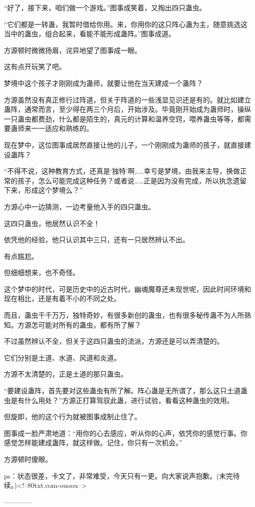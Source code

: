 \begin{this_body}
“好了，接下来，咱们做一个游戏。”图事成笑着，又掏出四只蛊虫。

“它们都是一转蛊，我暂时借给你用。来，你用你的这只阵心蛊为主，随意挑选这当中的蛊虫，组合起来，看能不能形成蛊阵。”图事成道。

方源顿时微微扬眉，诧异地望了图事成一眼。

这有点开玩笑了吧。

梦境中这个孩子才刚刚成为蛊师，就要让他在当天建成一个蛊阵？

方源虽然没有真正修行过阵道，但关于阵道的一些浅显见识还是有的。就比如建立蛊阵，通常而言，至少得在两三个月后，开始涉及。毕竟刚开始成为蛊师时，操纵一只蛊虫都费劲，什么都是陌生的，真元的计算和温养空窍，喂养蛊虫等等，都需要蛊师来一一适应和熟练的。

现在梦中，这位图事成居然直接让他的儿子，一个刚刚成为蛊师的孩子，就直接建设蛊阵？

“不得不说，这种教育方式，还真是‘独特’啊……幸亏是梦境，由我来主导，换做正常的孩子，怎么可能完成这种任务？或者说……正是因为没有完成，所以执念遗留下来，形成这个梦境么？”

方源心中一边猜测，一边考量他入手的四只蛊虫。

这四只蛊虫，他居然认识不全！

依凭他的经验，他只认识其中三只，还有一只居然辨认不出。

有点尴尬。

但细细想来，也不奇怪。

这个梦中的时代，可是历史中的近古时代，幽魂魔尊还未现世呢，因此时间环境和现在相比，还是有着不小的不同之处。

而且，蛊虫千千万万，独特奇妙，有很多新创的蛊虫，也有很多秘传蛊不为人所熟知。方源怎可能对所有的蛊虫，都有所了解？

不过虽然辨认不全，但关于这四只蛊虫的流派，方源还是可以弄清楚的。

它们分别是土道、水道、风道和炎道。

方源不太清楚的，正是土道的那只蛊虫。

“要建设蛊阵，首先要对这些蛊虫有所了解。阵心蛊是无所谓了，那么这只土道蛊虫是有什么用处？”方源正打算驾驭此蛊，进行试验，看看这种蛊虫的效用。

但旋即，他的这个行为就被图事成制止住了。

图事成一脸严肃地道：“用你的心去感应，听从你的心声，依凭你的感觉行事。你感觉怎样能建成蛊阵，就这样做。记住，你只有一次机会。”

方源顿时傻眼。

ps：状态很差，卡文了，非常难受，今天只有一更。向大家说声抱歉。(未完待续。)<!--80txt.com-ouoou-->

------------

\end{this_body}

